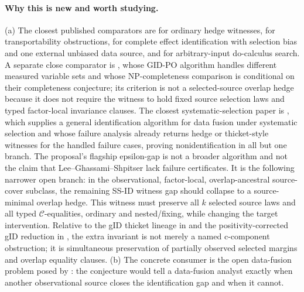 \documentclass[11pt]{article}
\theoremstyle{definition}
\theoremstyle{plain}
\theoremstyle{remark}
\begin{document}
\paragraph{Why this is new and worth studying.}
(a) The closest published comparators are \citet{ShpitserPearl2006ID} for
ordinary hedge witnesses, \citet{BareinboimPearl2012TransportCompleteness}
for transportability obstructions,
\citet{CorreaTianBareinboim2019SelectionEffects} for complete effect
identification with selection bias and one external unbiased data source, and
\citet{TikkaHyttinenKarvanen2021DoSearch} for arbitrary-input do-calculus
search.  A separate close comparator is
\citet{LeeBareinboim2020PartialObservability}, whose GID-PO algorithm handles
different measured variable sets and whose NP-completeness comparison is
conditional on their completeness conjecture; its criterion is not a
selected-source overlap hedge because it does not require the witness to hold
fixed source selection laws and typed factor-local invariance clauses.  The
closest systematic-selection paper is \citet{LeeGhassamiShpitser2024DataFusionSelection},
which supplies a general identification algorithm for data fusion under
systematic selection and whose failure analysis already returns hedge or
thicket-style witnesses for the handled failure cases, proving
nonidentification in all but one branch.  The proposal's flagship epsilon-gap
is not a broader algorithm and not the claim that Lee--Ghassami--Shpitser lack
failure certificates.  It is the following narrower open branch: in the
observational, factor-local, overlap-ancestral source-cover subclass, the
remaining SS-ID witness gap should collapse to a source-minimal overlap hedge.
This witness must preserve all \(k\) selected source laws and all typed
\(\mathcal C\)-equalities, ordinary and nested/fixing, while changing the
target intervention.  Relative
to the gID thicket lineage in \citet{LeeCorreaBareinboim2020GID} and the
positivity-corrected gID reduction in
\citet{KivvaMokhtarianEtesamiKiyavash2022RevisitGID}, the extra invariant is
not merely a named c-component obstruction; it is simultaneous preservation of
partially observed selected margins and overlap equality clauses.  (b) The
concrete consumer is the open data-fusion problem posed by
\citet{BareinboimPearl2016DataFusion}: the conjecture would tell a
data-fusion analyst exactly when another observational source closes the
identification gap and when it cannot.
\end{document}
